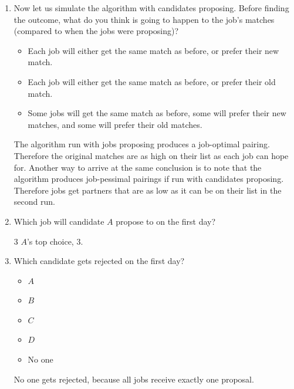 \documentclass[11pt, preview]{standalone} %
\begin{document}
\begin{enumerate}
\begin{enumerate}
\begin{Freeform}{C}
\Solution Candidate $C$.
\end{Freeform}

\item Now let us simulate the algorithm with candidates proposing. Before finding the outcome, what do you think is going to happen to the job's matches (compared to when the jobs were proposing)?
\begin{Choices}
\begin{itemize}
\FalseChoice\item Each job will either get the same match as before, or prefer their new match.
\TrueChoice\item Each job will either get the same match as before, or prefer their old match.
\FalseChoice\item Some jobs will get the same match as before, some will prefer their new matches, and some will prefer their old matches.
\end{itemize}
\Solution The algorithm run with jobs proposing produces a job-optimal pairing. Therefore the original matches are as high on their list as each job can hope for. Another way to arrive at the same conclusion is to note that the algorithm produces job-pessimal pairings if run with candidates proposing. Therefore jobs get partners that are as low as it can be on their list in the second run.
\end{Choices}

\item Which job will candidate $A$ propose to on the first day?
\begin{Freeform}{3}
\Solution $A$'s top choice, $3$.	
\end{Freeform}

\item Which candidate gets rejected on the first day?
\begin{Choices}
\begin{itemize}
\FalseChoice\item $A$
\FalseChoice\item $B$
\FalseChoice\item $C$
\FalseChoice\item $D$
\TrueChoice\item No one
\end{itemize}
\Solution No one gets rejected, because all jobs receive exactly one proposal.
\end{Choices}



\end{enumerate}
\end{enumerate}
\end{document}
